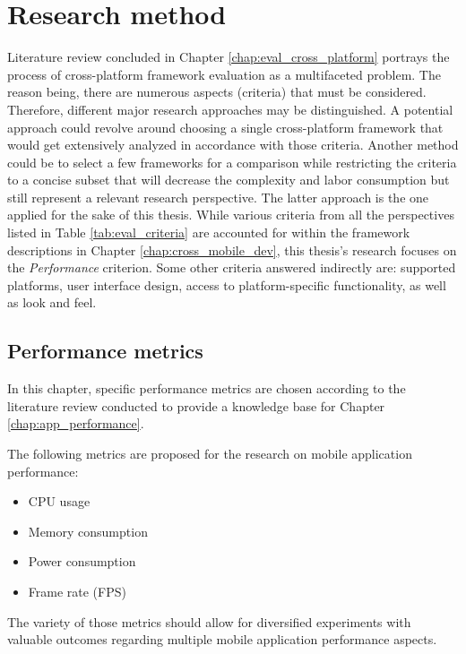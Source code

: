 
\chapter{Research method}

Literature review concluded in Chapter \ref{chap:eval_cross_platform} portrays the process of cross-platform framework evaluation as a multifaceted problem. The reason being, there are numerous aspects (criteria) that must be considered. Therefore, different major research approaches may be distinguished. A potential approach could revolve around choosing a single cross-platform framework that would get extensively analyzed in accordance with those criteria. Another method could be to select a few frameworks for a comparison while restricting the criteria to a concise subset that will decrease the complexity and labor consumption but still represent a relevant research perspective. The latter approach is the one applied for the sake of this thesis. While various criteria from all the perspectives listed in Table \ref{tab:eval_criteria} are accounted for within the framework descriptions in Chapter \ref{chap:cross_mobile_dev}, this thesis's research focuses on the \emph{Performance} criterion. Some other criteria answered indirectly are: supported platforms, user interface design, access to platform-specific functionality, as well as look and feel.

\section{Performance metrics}

In this chapter, specific performance metrics are chosen according to the literature review conducted to provide a knowledge base for Chapter \ref{chap:app_performance}.

\bigskip

The following metrics are proposed for the research on mobile application performance:
\begin{itemize}
    \item CPU usage
    \item Memory consumption
    \item Power consumption
    \item Frame rate (FPS)
\end{itemize}

The variety of those metrics should allow for diversified experiments with valuable outcomes regarding multiple mobile application performance aspects.

